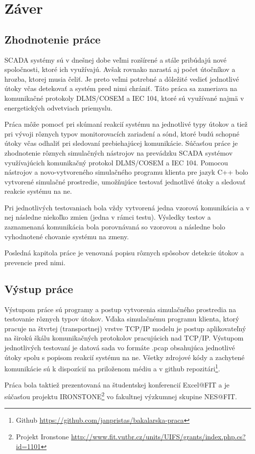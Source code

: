 \chapter{Záver}
\section*{Zhodnotenie práce}
SCADA systémy sú v dnešnej dobe veľmi rozšírené a stále pribúdajú nové spoločnosti, ktoré ich využívajú. Avšak rovnako narastá aj počet útočníkov a hrozba, ktorej musia čeliť. Je preto veľmi potrebné a dôležité vedieť jednotlivé útoky včas detekovať a systém pred nimi chrániť. Táto práca sa zameriava na komunikačné protokoly DLMS/COSEM a IEC 104, ktoré sú využívané najmä v energetických odvetviach priemyslu. \par
Práca môže pomocť pri skúmaní reakcií systému na jednotlivé typy útokov a tiež pri vývoji rôznych typov monitorovacích zariadení a sónd, ktoré budú schopné útoky včas odhaliť pri sledovaní prebiehajúcej komunikácie. Súčasťou práce je zhodnotenie rôznych simulačných nástrojov na prevádzku SCADA systémov využívajúcich komunikačný protokol DLMS/COSEM a IEC 104. Pomocou nástrojov a novo-vytvoreného simulačného programu klienta pre jazyk C++ bolo vytvorené simulačné prostredie, umožňujúce testovať jednotlivé útoky a sledovať reakcie systému na ne. \par
Pri jednotlivých testovaniach bola vždy vytvorená jedna vzorová komunikácia a v nej následne niekoľko zmien (jedna v rámci testu). Výsledky testov a zaznamenaná komunikácia bola porovnávaná so vzorovou a následne bolo vyhodnotené chovanie systému na zmeny. \par
Posledná kapitola práce je venovaná popisu rôznych spôsobov detekcie útokov a prevencie pred nimi.
\section*{Výstup práce}
Výstupom práce sú programy a postup vytvorenia simulačného prostredia na testovanie rôznych typov útokov. Vďaka simulačnému programu klienta, ktorý pracuje na štvrtej (transportnej) vrstve TCP/IP modelu je postup aplikovateľný na širokú škálu komunikačných protokolov pracujúcich nad TCP/IP. Výstupom jednotlivých testovaní je datová sada vo formáte .pcap obsahujúca jednotlivé útoky spolu s popisom reakcií systému na ne. Všetky zdrojové kódy a zachytené komunikácie sú k dispozícií na priloženom médiu a v github repozitári\footnote{Github \url{https://github.com/janpristas/bakalarska-praca}}. \par
Práca bola taktiež prezentovaná na študentskej konferencií Excel@FIT a je súčasťou projektu IRONSTONE\footnote{Projekt Ironstone \url{http://www.fit.vutbr.cz/units/UIFS/grants/index.php.cs?id=1101}} vo fakultnej výzkumnej skupine NES@FIT.